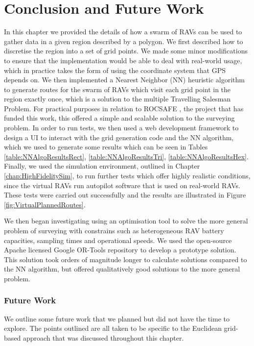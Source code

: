 \section{Conclusion and Future Work}\label{sec:SurveyingConclusionFutureWork}
In this chapter we provided the details of how a swarm of RAVs can be used to gather data in a given region described by a polygon. We first described how to discretise the region into a set of grid points. We made some minor modifications to ensure that the implementation would be able to deal with real-world usage, which in practice takes the form of using the coordinate system that GPS depends on. We then implemented a Nearest Neighbor (NN) heuristic algorithm to generate routes for the swarm of RAVs which visit each grid point in the region exactly once, which is a solution to the multiple Travelling Salesman Problem. For practical purposes in relation to ROCSAFE \cite{Bagherzadeh2017ROCSAFE:Incidents}, the project that has funded this work, this offered a simple and scalable solution to the surveying problem. In order to run tests, we then used a web development framework to design a UI to interact with the grid generation code and the NN algorithm, which we used to generate some results which can be seen in Tables \ref{table:NNAlgoResultsRect}, \ref{table:NNAlgoResultsTri}, \ref{table:NNAlgoResultsHex}. %
Finally, we used the simulation environment, outlined in Chapter \ref{chap:HighFidelitySim}, to run further tests which offer highly realistic conditions, since the virtual RAVs run autopilot software that is used on real-world RAVs. These tests were carried out successfully and the results are illustrated in Figure \ref{fig:VirtualPlannedRoutes}. 

We then began investigating using an optimisation tool to solve the more general problem of surveying with constrains such as heterogeneous RAV battery capacities, sampling times and operational speeds. We used the open-source Apache licensed Google OR-Tools repository to develop a prototype solution. This solution took orders of magnitude longer to calculate solutions compared to the NN algorithm, but offered qualitatively good solutions to the more general problem.



\subsubsection{Future Work}
We outline some future work that we planned but did not have the time to explore. The points outlined are all taken to be specific to the Euclidean grid-based approach that was discussed throughout this chapter.

